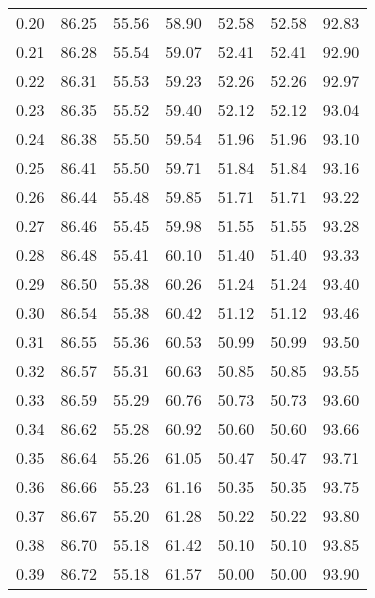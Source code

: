 \begin{tabular}{|c|c|c|c|c|c|c|}
      0.20 &     86.25 &     55.56 &      58.90 &   52.58 &      52.58 &         92.83 \\
      0.21 &     86.28 &     55.54 &      59.07 &   52.41 &      52.41 &         92.90 \\
      0.22 &     86.31 &     55.53 &      59.23 &   52.26 &      52.26 &         92.97 \\
      0.23 &     86.35 &     55.52 &      59.40 &   52.12 &      52.12 &         93.04 \\
      0.24 &     86.38 &     55.50 &      59.54 &   51.96 &      51.96 &         93.10 \\
      0.25 &     86.41 &     55.50 &      59.71 &   51.84 &      51.84 &         93.16 \\
      0.26 &     86.44 &     55.48 &      59.85 &   51.71 &      51.71 &         93.22 \\
      0.27 &     86.46 &     55.45 &      59.98 &   51.55 &      51.55 &         93.28 \\
      0.28 &     86.48 &     55.41 &      60.10 &   51.40 &      51.40 &         93.33 \\
      0.29 &     86.50 &     55.38 &      60.26 &   51.24 &      51.24 &         93.40 \\
      0.30 &     86.54 &     55.38 &      60.42 &   51.12 &      51.12 &         93.46 \\
      0.31 &     86.55 &     55.36 &      60.53 &   50.99 &      50.99 &         93.50 \\
      0.32 &     86.57 &     55.31 &      60.63 &   50.85 &      50.85 &         93.55 \\
      0.33 &     86.59 &     55.29 &      60.76 &   50.73 &      50.73 &         93.60 \\
      0.34 &     86.62 &     55.28 &      60.92 &   50.60 &      50.60 &         93.66 \\
      0.35 &     86.64 &     55.26 &      61.05 &   50.47 &      50.47 &         93.71 \\
      0.36 &     86.66 &     55.23 &      61.16 &   50.35 &      50.35 &         93.75 \\
      0.37 &     86.67 &     55.20 &      61.28 &   50.22 &      50.22 &         93.80 \\
      0.38 &     86.70 &     55.18 &      61.42 &   50.10 &      50.10 &         93.85 \\
      0.39 &     86.72 &     55.18 &      61.57 &   50.00 &      50.00 &         93.90 \\

\end{tabular}
